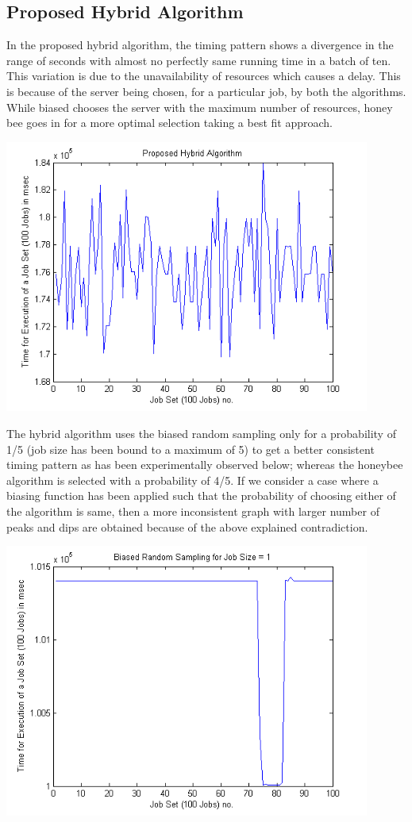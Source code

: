 \subsection{Proposed Hybrid Algorithm}
In the proposed hybrid algorithm, the timing pattern shows a divergence in the range of seconds with almost no perfectly same running time in a batch of ten. This variation is due to the unavailability of resources which causes a delay. This is because of the server being chosen, for a particular job, by both the algorithms. While biased chooses the server with the maximum number of resources, honey bee goes in for a more optimal selection taking a best fit approach.
\begin{center}
\includegraphics[width=0.9\textwidth]{hybrid}\\[0.3cm]
\end{center}
The hybrid algorithm uses the biased random sampling only for a probability of 1/5 (job size has been bound to a maximum of 5) to get a better consistent timing pattern as has been experimentally observed below; whereas the honeybee algorithm is selected with a probability of 4/5. If we consider a case where a biasing function has been applied such that the probability of choosing either of the algorithm is same, then a more inconsistent graph with larger number of peaks and dips are obtained because of the above explained contradiction.
\begin{center}
\includegraphics[width=0.9\textwidth]{biased1}\\[0.3cm]
\end{center}
